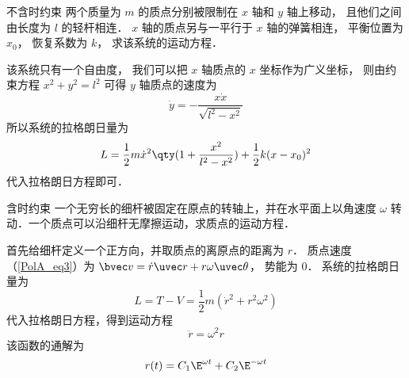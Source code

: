 \begin{example}{不含时约束}
两个质量为 $m$ 的质点分别被限制在 $x$ 轴和 $y$ 轴上移动， 且他们之间由长度为 $l$ 的轻杆相连． $x$ 轴的质点另与一平行于 $x$ 轴的弹簧相连， 平衡位置为 $x_0$， 恢复系数为 $k$， 求该系统的运动方程．%

该系统只有一个自由度， 我们可以把 $x$ 轴质点的 $x$ 坐标作为广义坐标， 则由约束方程 $x^2 + y^2 = l^2$ 可得 $y$ 轴质点的速度为
\begin{equation}
\dot y = -\frac{x\dot x}{\sqrt{l^2 - x^2}}
\end{equation}
所以系统的拉格朗日量为
\begin{equation}
L = \frac12 m \dot x^2\qty(1 + \frac{x^2}{l^2 - x^2}) + \frac12 k (x-x_0)^2
\end{equation}
代入拉格朗日方程即可．
\end{example}

\begin{example}{含时约束}
一个无穷长的细杆被固定在原点的转轴上，并在水平面上以角速度 $\omega$ 转动．一个质点可以沿细杆无摩擦运动，求质点的运动方程．

首先给细杆定义一个正方向，并取质点的离原点的距离为 $r$． 质点速度（\autoref{PolA_eq3}）为 $\bvec v = \dot r \uvec r + r\omega \uvec\theta$， 势能为 0． 系统的拉格朗日量为
\begin{equation}
L = T - V = \frac12 m(\dot r^2 + r^2 \omega^2)
\end{equation}
代入拉格朗日方程，得到运动方程
\begin{equation}
\ddot r = \omega^2 r
\end{equation}
该函数的通解为%
\begin{equation}
r(t) = C_1 \E^{\omega t} + C_2 \E^{-\omega t}
\end{equation}
\end{example}

